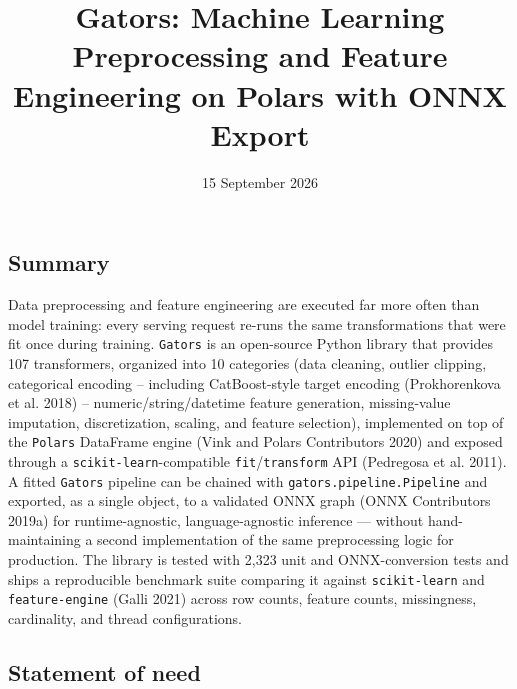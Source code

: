 \documentclass[
]{article}
\title{Gators: Machine Learning Preprocessing and Feature Engineering on
Polars with ONNX Export}
\author{}
\date{15 September 2026}
\begin{document}
\maketitle

\subsection{Summary}\label{summary}

Data preprocessing and feature engineering are executed far more often
than model training: every serving request re-runs the same
transformations that were fit once during training. \texttt{Gators} is
an open-source Python library that provides 107 transformers, organized
into 10 categories (data cleaning, outlier clipping, categorical
encoding -- including CatBoost-style target encoding (Prokhorenkova et
al. 2018) -- numeric/string/datetime feature generation, missing-value
imputation, discretization, scaling, and feature selection), implemented
on top of the \texttt{Polars} DataFrame engine (Vink and Polars
Contributors 2020) and exposed through a
\texttt{scikit-learn}-compatible \texttt{fit}/\texttt{transform} API
(Pedregosa et al. 2011). A fitted \texttt{Gators} pipeline can be
chained with \texttt{gators.pipeline.Pipeline} and exported, as a single
object, to a validated ONNX graph (ONNX Contributors 2019a) for
runtime-agnostic, language-agnostic inference --- without
hand-maintaining a second implementation of the same preprocessing logic
for production. The library is tested with 2,323 unit and
ONNX-conversion tests and ships a reproducible benchmark suite comparing
it against \texttt{scikit-learn} and \texttt{feature-engine} (Galli
2021) across row counts, feature counts, missingness, cardinality, and
thread configurations.

\subsection{Statement of need}\label{statement-of-need}
\end{document}
